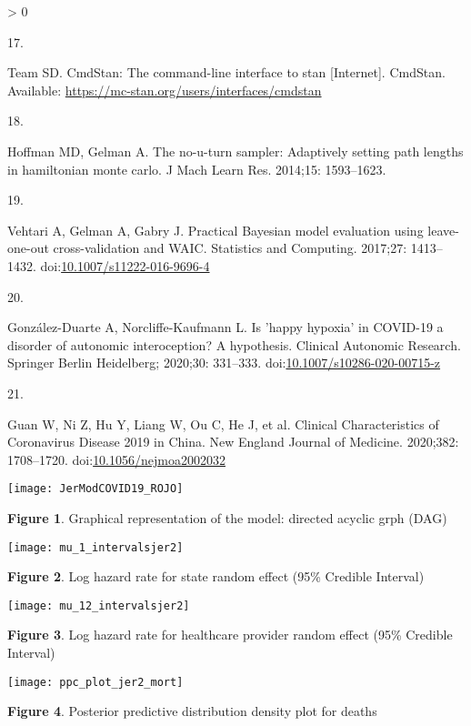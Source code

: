 \documentclass[10pt,letterpaper]{article}
\newlength{\csllabelwidth}
\newlength{\cslhangindent}
\newenvironment{CSLReferences}[3] %
 {%
  \setlength{\parindent}{0pt}
  \ifodd #1 \everypar{\setlength{\hangindent}{\cslhangindent}}\ignorespaces\fi
  \ifnum #2 > 0
  \setlength{\parskip}{#2\baselineskip}
  \fi
 }%
 {}
\newcommand{\CSLLeftMargin}[1]{\parbox[t]{\csllabelwidth}{#1}}
\newcommand{\CSLRightInline}[1]{\parbox[t]{\linewidth - \csllabelwidth}{#1}}
\begin{document}
\begin{CSLReferences}{0}{0}
\leavevmode\hypertarget{ref-standevelopment}{}%
\CSLLeftMargin{17. }
\CSLRightInline{Team SD. CmdStan: The command-line interface to stan
{[}Internet{]}. CmdStan. Available:
\url{https://mc-stan.org/users/interfaces/cmdstan}}

\leavevmode\hypertarget{ref-hoffman2014no}{}%
\CSLLeftMargin{18. }
\CSLRightInline{Hoffman MD, Gelman A. The no-u-turn sampler: Adaptively
setting path lengths in hamiltonian monte carlo. J Mach Learn Res.
2014;15: 1593--1623. }

\leavevmode\hypertarget{ref-Vehtari2017}{}%
\CSLLeftMargin{19. }
\CSLRightInline{Vehtari A, Gelman A, Gabry J. {Practical Bayesian model
evaluation using leave-one-out cross-validation and WAIC}. Statistics
and Computing. 2017;27: 1413--1432.
doi:\href{https://doi.org/10.1007/s11222-016-9696-4}{10.1007/s11222-016-9696-4}}

\leavevmode\hypertarget{ref-Gonzalez-Duarte2020}{}%
\CSLLeftMargin{20. }
\CSLRightInline{González-Duarte A, Norcliffe-Kaufmann L. {Is 'happy
hypoxia' in COVID-19 a disorder of autonomic interoception? A
hypothesis}. Clinical Autonomic Research. Springer Berlin Heidelberg;
2020;30: 331--333.
doi:\href{https://doi.org/10.1007/s10286-020-00715-z}{10.1007/s10286-020-00715-z}}

\leavevmode\hypertarget{ref-Guan2020}{}%
\CSLLeftMargin{21. }
\CSLRightInline{Guan W, Ni Z, Hu Y, Liang W, Ou C, He J, et al.
{Clinical Characteristics of Coronavirus Disease 2019 in China}. New
England Journal of Medicine. 2020;382: 1708--1720.
doi:\href{https://doi.org/10.1056/nejmoa2002032}{10.1056/nejmoa2002032}}

\end{CSLReferences}

\newpage

\begin{center}\texttt{[image: JerModCOVID19\_ROJO]} \end{center}

\textbf{Figure 1}. Graphical representation of the model: directed
acyclic grph (DAG)

\begin{center}\texttt{[image: mu\_1\_intervalsjer2]} \end{center}

\textbf{Figure 2}. Log hazard rate for state random effect (95\%
Credible Interval)

\begin{center}\texttt{[image: mu\_12\_intervalsjer2]} \end{center}

\textbf{Figure 3}. Log hazard rate for healthcare provider random effect
(95\% Credible Interval)

\begin{center}\texttt{[image: ppc\_plot\_jer2\_mort]} \end{center}

\textbf{Figure 4}. Posterior predictive distribution density plot for
deaths

\nolinenumbers
\end{document}
